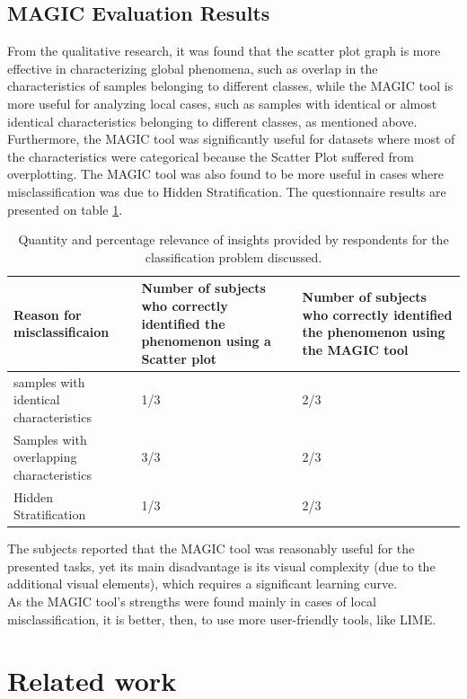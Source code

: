 \documentclass[11pt]{article}
\begin{document}
\subsection{MAGIC Evaluation Results}\label{MAGIC Evaluation Results}
From the qualitative research, it was found that the scatter plot graph is more effective in characterizing global phenomena, such as overlap in the characteristics of samples belonging to different classes, while the MAGIC tool is more useful for analyzing local cases, such as samples with identical or almost identical characteristics belonging to different classes, as mentioned above. Furthermore, the MAGIC tool was significantly useful for datasets where most of the characteristics were categorical because the Scatter Plot suffered from overplotting. The MAGIC tool was also found to be more useful in cases where misclassification was due to Hidden Stratification. The questionnaire results are presented on table \ref{table:tab2}.\\



\begin{table}[H]
\centering
\begin{tabular}{ |m{4cm}||m{4.5cm}|m{4.5cm}| } 
\hline
Reason for misclassificaion & Number of subjects who correctly identified the phenomenon using a Scatter plot & Number of subjects who correctly identified the phenomenon using the MAGIC tool \\
\hline
\hline
samples with identical characteristics & 1/3 & 2/3 \\
\hline
Samples with overlapping characteristics & 3/3 & 2/3 \\
\hline
Hidden Stratification & 1/3 & 2/3 \\
\hline
\end{tabular}
\caption{Quantity and percentage relevance of insights provided by respondents for the classification problem discussed.}
\label{table:tab2}
\end{table}

The subjects reported that the MAGIC tool was reasonably useful for the presented tasks, yet its main disadvantage is its visual complexity (due to the additional visual elements), which requires a significant learning curve. \\
As the MAGIC tool's strengths were found mainly in cases of local misclassification, it is better, then, to use more user-friendly tools, like LIME.


\section{Related work}\label{Related work}
\end{document}
